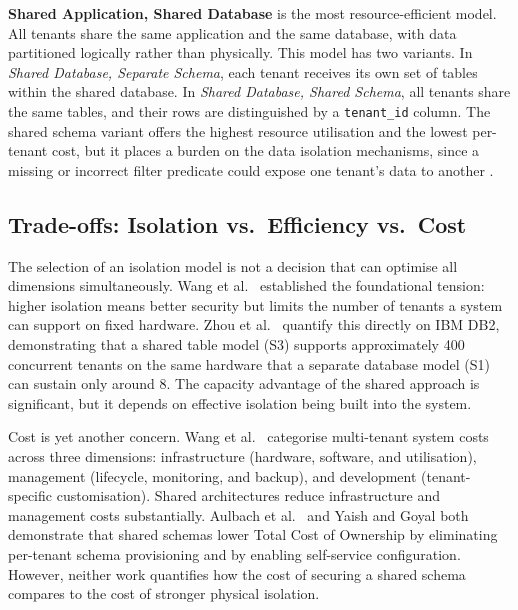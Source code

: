 \textbf{Shared Application, Shared Database} is the most resource-efficient
model. All tenants share the same application and the same database, with data
partitioned logically rather than physically. This model has two variants. In
\textit{Shared Database, Separate Schema}, each tenant receives its own set of
tables within the shared database. In \textit{Shared Database, Shared Schema},
all tenants share the same tables, and their rows are distinguished by a
\texttt{tenant\_id} column. The shared schema variant offers the highest resource
utilisation and the lowest per-tenant cost, but it places a burden on
the data isolation mechanisms, since a missing or incorrect filter predicate could
expose one tenant's data to another \cite{wangStudyPerformanceEvaluation2008}.

\subsection*{Trade-offs: Isolation vs.\ Efficiency vs.\ Cost}
The selection of an isolation model is not a decision that can optimise all
dimensions simultaneously. Wang et al.\ \cite{wangStudyPerformanceEvaluation2008} established the foundational tension: higher isolation means better security but limits the
number of tenants a system can support on fixed hardware. Zhou et al.\
\cite{zhouDB2MMTMassiveMultitenant2011} quantify this directly on IBM DB2, demonstrating that a shared table model (S3) supports approximately 400 concurrent tenants on the same
hardware that a separate database model (S1) can sustain only around 8. The
capacity advantage of the shared approach is significant, but it depends
on effective isolation being built into the system.

Cost is yet another concern. Wang et al.\ \cite{wangStudyPerformanceEvaluation2008} categorise multi-tenant system costs across three dimensions: infrastructure
(hardware, software, and utilisation), management (lifecycle, monitoring, and
backup), and development (tenant-specific customisation). Shared architectures
reduce infrastructure and management costs substantially. Aulbach et al.\
\cite{aulbachExtensibilityDataSharing2011} and Yaish and Goyal \cite{yaishMultitenantDatabaseArchitecture2013} both demonstrate that
shared schemas lower Total Cost of Ownership by eliminating per-tenant schema
provisioning and by enabling self-service configuration. However, neither work
quantifies how the cost of securing a shared schema compares to the cost of
stronger physical isolation.

